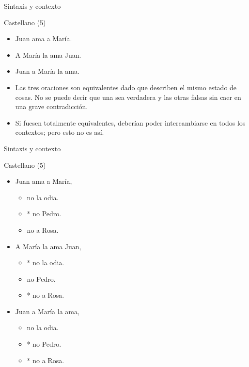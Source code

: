 \documentclass{beamer}
\begin{document}
\begin{frame}{Sintaxis y contexto}

	Castellano (5)

	\vspace{0.5cm}
	
	\begin{itemize}
		\item Juan ama a María.
		\item A María la ama Juan.
		\item Juan a María la ama.
		
		\pause
		
		\item Las tres oraciones son equivalentes dado que describen el mismo estado de cosas. No se puede decir que una sea verdadera y las otras falsas sin caer en una grave contradicción.
		\item Si fuesen totalmente equivalentes, deberían poder intercambiarse en todos los contextos; pero esto no es así.
	\end{itemize}


\end{frame}


\begin{frame}{Sintaxis y contexto}

	Castellano (5)

	\vspace{0.5cm}
		
	\begin{itemize}
		\item Juan ama a María,
		\begin{itemize}
			\item no la odia.
			\item * no Pedro.
			\item no a Rosa.
		\end{itemize}
		\item A María la ama Juan,
		\begin{itemize}
			\item * no la odia.
			\item no Pedro.
			\item * no a Rosa.
		\end{itemize}
		\item Juan a María la ama,
		\begin{itemize}
			\item no la odia.
			\item * no Pedro.
			\item * no a Rosa.
		\end{itemize}
	\end{itemize}

\end{frame}
\end{document}
